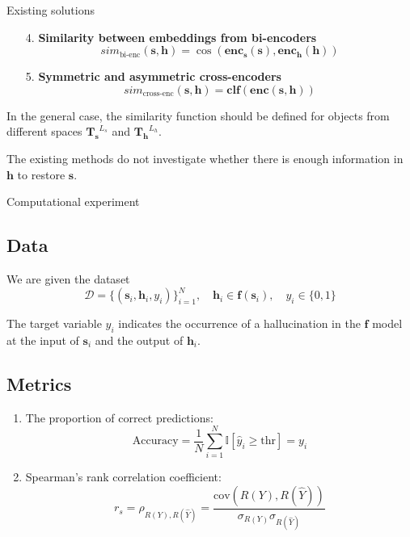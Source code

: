 \documentclass{beamer}
\begin{document}
\begin{frame}{Existing solutions}

\begin{enumerate}
    \item[4.] \textbf{Similarity between embeddings from bi-encoders} \[sim_\text{bi-enc}(\mathbf{s}, \mathbf{h}) = \cos (\mathbf{enc_s}(\mathbf{s}), \mathbf{enc_h}(\mathbf{h}))\]
    \item[5.] \textbf{Symmetric and asymmetric cross-encoders} \[sim_\text{cross-enc}(\mathbf{s}, \mathbf{h}) = \mathbf{clf}(\mathbf{enc}(\mathbf{s}, \mathbf{h}))\]
\end{enumerate}

In the general case, the similarity function should be defined for objects from different spaces $\mathbf{T_s}^{L_s}$ and $\mathbf{T_h}^{L_h}$. 

The existing methods do not investigate whether there is enough information in $\mathbf{h}$ to restore $\mathbf{s}$.

\end{frame}

\begin{frame}{Computational experiment}

\subsection{Data}

We are given the dataset
\[\mathcal{D} = \{(\mathbf{s}_i, \mathbf{h}_i, y_i) \}_{i=1}^N, \quad \mathbf{h}_i \in \mathbf{f}(\mathbf{s}_i), \quad y_i \in \{0, 1\}\]

The target variable $y_i$ indicates the occurrence of a hallucination in the $\mathbf{f}$ model at the input of $\mathbf{s}_i$ and the output of $\mathbf{h}_i$.

\subsection{Metrics}

\begin{enumerate}
    \item The proportion of correct predictions:
    \[\text{Accuracy} = \frac1N \sum\limits_{i=1}^N \mathbb{I}[\hat{y}_i \ge \text{thr}] = y_i\]
    \item Spearman's rank correlation coefficient:
    \[r_s= \rho_{R(Y), R(\hat{Y})} = \frac{\text{cov} (R(Y), R(\hat{Y}))}{\sigma_{R(Y)} \sigma_{R(\hat{Y})}}\]
\end{enumerate}


\end{frame}
\end{document}
